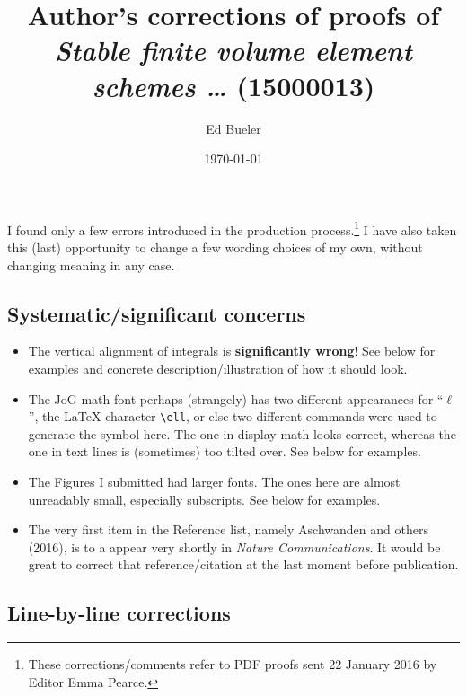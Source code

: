 \documentclass[11pt,reqno]{amsart}
\title[Author's corrections of proofs of 15000013]{Author's corrections of proofs of \\ \emph{Stable finite volume element schemes \dots} (15000013)}
\author{Ed Bueler}
\date{\today}
\begin{document}
\maketitle

\thispagestyle{empty}

I found only a few errors introduced in the production process.\footnote{These corrections/comments refer to PDF proofs sent 22 January 2016 by Editor Emma Pearce.}  I have also taken this (last) opportunity to change a few wording choices of my own, without changing meaning in any case.

\subsection*{Systematic/significant concerns}

\begin{itemize}
\item  The vertical alignment of integrals is \textbf{significantly wrong}!  See below for examples and concrete description/illustration of how it should look.
\item  The JoG math font perhaps (strangely) has two different appearances for ``$\ell$'', the LaTeX character \verb|\ell|, or else two different commands were used to generate the symbol here.  The one in display math looks correct, whereas the one in text lines is (sometimes) too tilted over.  See below for examples.
\item  The Figures I submitted had larger fonts.  The ones here are almost unreadably small, especially subscripts.  See below for examples.
\item  The very first item in the Reference list, namely Aschwanden and others (2016), is to a appear very shortly in \emph{Nature Communications}.  It would be great to correct that reference/citation at the last moment before publication.
\end{itemize}


\subsection*{Line-by-line corrections}
\end{document}
